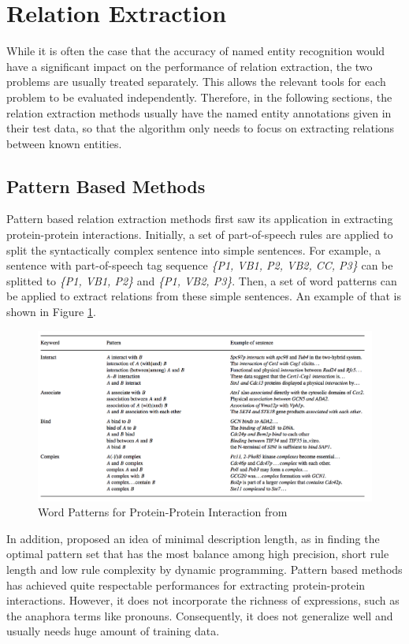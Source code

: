 \section{Relation Extraction}%
While it is often the case that the accuracy of named entity recognition would have a significant impact on the performance of relation extraction, the two problems are usually treated separately. This allows the relevant tools for each problem to be evaluated independently. Therefore, in the following sections, the relation extraction methods usually have the named entity annotations given in their test data, so that the algorithm only needs to focus on extracting relations between known entities.
\subsection{Pattern Based Methods}
Pattern based relation extraction methods first saw its application in extracting protein-protein interactions\cite{hao2005discovering}. Initially, a set of part-of-speech rules are applied to split the syntactically complex sentence into simple sentences. For example, a sentence with part-of-speech tag sequence \emph{\big\{P1, VB1, P2, VB2, CC, P3\big\}} can be splitted to \emph{\big\{P1, VB1, P2\big\}} and \emph{\big\{P1, VB2, P3\big\}}. Then, a set of word patterns can be applied to extract relations from these simple sentences\cite{ono2001automated}. An example of that is shown in Figure \ref{fig:Word_Patterns}. 
	\begin{figure}
		\centering
		\includegraphics[width=\textwidth]{Word_Patterns}
		\caption{Word Patterns for Protein-Protein Interaction from \citet*{ono2001automated}}
		\label{fig:Word_Patterns}   
	\end{figure}
In addition, \citet{hao2005discovering} proposed an idea of minimal description length, as in finding the optimal pattern set that has the most balance among high precision, short rule length and low rule complexity by dynamic programming. Pattern based methods has achieved quite respectable performances for extracting protein-protein interactions\cite{hao2005discovering}. However, it does not incorporate the richness of expressions, such as the anaphora terms like pronouns. Consequently, it does not generalize well and usually needs huge amount of training data.
